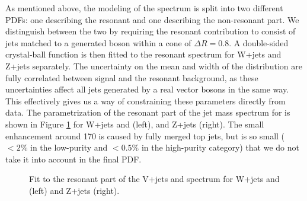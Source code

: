 As mentioned above, the modeling of the \MJ spectrum is split into two different PDFs: one describing the resonant and one describing the non-resonant part. We distinguish between the two by requiring the resonant contribution to consist of jets matched to a generated boson within a cone of $\Delta R = 0.8$. A double-sided crystal-ball function is then fitted to the resonant spectrum for W+jets and Z+jets separately. The uncertainty on the mean and width of the \MJ distribution are fully correlated between signal and the resonant background, as these uncertainties affect all jets generated by a real vector bosons in the same way. This effectively gives us a way of constraining these parameters directly from data. The parametrization of the resonant part of the jet mass spectrum for \MJO is shown in Figure \ref{fig:Vjets_fits} for W+jets and \ttbar (left), and Z+jets (right). The small enhancement around 170 \GeV is caused by fully merged top jets, but is so small ($<2\%$ in the low-purity and $<0.5\%$ in the high-purity category) that we do not take it into account in the final PDF.
\begin{figure}[h!]
\centering
{}
\caption{Fit to the resonant part of the V+jets and \ttbar spectrum for W+jets and \ttbar (left) and Z+jets (right).}
\label{fig:Vjets_fits}
\end{figure}
